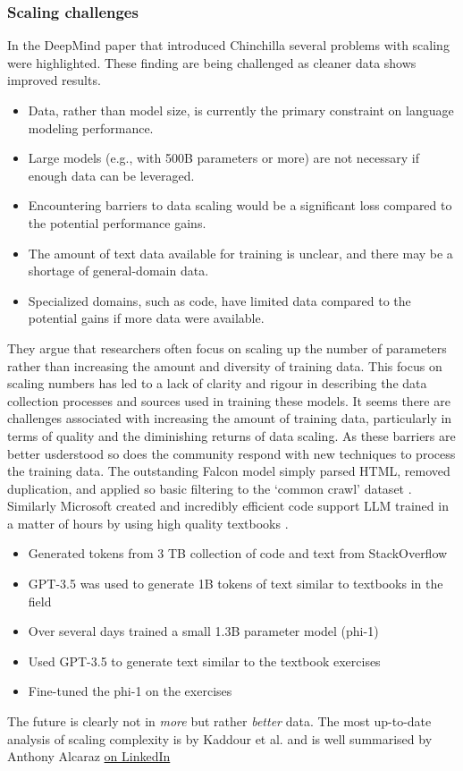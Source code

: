 \subsubsection{Scaling challenges}
In the DeepMind paper that introduced Chinchilla \cite{hoffmann2022empirical} several problems with scaling were highlighted. These finding are being challenged as cleaner data shows improved results.
\begin{itemize}
\item Data, rather than model size, is currently the primary constraint on language modeling performance.
\item Large models (e.g., with 500B parameters or more) are not necessary if enough data can be leveraged.
\item Encountering barriers to data scaling would be a significant loss compared to the potential performance gains.
\item The amount of text data available for training is unclear, and there may be a shortage of general-domain data.
\item Specialized domains, such as code, have limited data compared to the potential gains if more data were available.
\end{itemize}
They argue that researchers often focus on scaling up the number of parameters rather than increasing the amount and diversity of training data. This focus on scaling numbers has led to a lack of clarity and rigour in describing the data collection processes and sources used in training these models. It seems  there are challenges associated with increasing the amount of training data, particularly in terms of quality and the diminishing returns of data scaling. As these barriers are better usderstood so does the community respond with new techniques to process the training data. The outstanding Falcon model simply parsed HTML, removed duplication, and applied so basic filtering to the `common crawl' dataset \cite{penedo2023refinedweb}. Similarly Microsoft created and incredibly efficient code support LLM trained in a matter of hours by using high quality textbooks \cite{gunasekar2023textbooks}.
\begin{itemize}
\item Generated tokens from 3 TB collection of code and text from StackOverflow
\item GPT-3.5 was used to generate 1B tokens of text similar to textbooks in the field
\item Over several days trained a small 1.3B parameter model (phi-1)
\item Used GPT-3.5 to generate text similar to the textbook exercises
\item Fine-tuned the phi-1 on the exercises
\end{itemize} 
The future is clearly not in \textit{more} but rather \textit{better} data. The most up-to-date analysis of scaling complexity is by Kaddour et al. and is well summarised by Anthony Alcaraz \href{https://www.linkedin.com/posts/anthony-alcaraz-b80763155_this-paper-is-a-must-read-for-those-interested-activity-7087728440300158976-wa_f?}{on LinkedIn} \cite{kaddour2023challenges}
 
